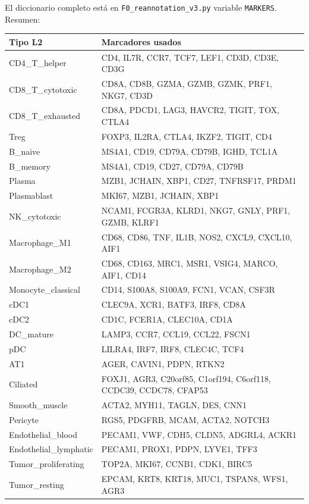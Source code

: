 \documentclass[11pt,a4paper]{article}
\begin{document}
El diccionario completo está en \texttt{F0\_reannotation\_v3.py} variable \texttt{MARKERS}. Resumen:

\begin{longtable}{|>{\ttfamily}l|p{8cm}|}
\hline
\rowcolor{lightgray}\textbf{Tipo L2} & \textbf{Marcadores usados} \\
\hline
CD4\_T\_helper & CD4, IL7R, CCR7, TCF7, LEF1, CD3D, CD3E, CD3G \\
CD8\_T\_cytotoxic & CD8A, CD8B, GZMA, GZMB, GZMK, PRF1, NKG7, CD3D \\
CD8\_T\_exhausted & CD8A, PDCD1, LAG3, HAVCR2, TIGIT, TOX, CTLA4 \\
Treg & FOXP3, IL2RA, CTLA4, IKZF2, TIGIT, CD4 \\
B\_naive & MS4A1, CD19, CD79A, CD79B, IGHD, TCL1A \\
B\_memory & MS4A1, CD19, CD27, CD79A, CD79B \\
Plasma & MZB1, JCHAIN, XBP1, CD27, TNFRSF17, PRDM1 \\
Plasmablast & MKI67, MZB1, JCHAIN, XBP1 \\
NK\_cytotoxic & NCAM1, FCGR3A, KLRD1, NKG7, GNLY, PRF1, GZMB, KLRF1 \\
Macrophage\_M1 & CD68, CD86, TNF, IL1B, NOS2, CXCL9, CXCL10, AIF1 \\
Macrophage\_M2 & CD68, CD163, MRC1, MSR1, VSIG4, MARCO, AIF1, CD14 \\
Monocyte\_classical & CD14, S100A8, S100A9, FCN1, VCAN, CSF3R \\
cDC1 & CLEC9A, XCR1, BATF3, IRF8, CD8A \\
cDC2 & CD1C, FCER1A, CLEC10A, CD1A \\
DC\_mature & LAMP3, CCR7, CCL19, CCL22, FSCN1 \\
pDC & LILRA4, IRF7, IRF8, CLEC4C, TCF4 \\
AT1 & AGER, CAVIN1, PDPN, RTKN2 \\
Ciliated & FOXJ1, AGR3, C20orf85, C1orf194, C6orf118, CCDC39, CCDC78, CFAP53 \\
Smooth\_muscle & ACTA2, MYH11, TAGLN, DES, CNN1 \\
Pericyte & RGS5, PDGFRB, MCAM, ACTA2, NOTCH3 \\
Endothelial\_blood & PECAM1, VWF, CDH5, CLDN5, ADGRL4, ACKR1 \\
Endothelial\_lymphatic & PECAM1, PROX1, PDPN, LYVE1, TFF3 \\
Tumor\_proliferating & TOP2A, MKI67, CCNB1, CDK1, BIRC5 \\
Tumor\_resting & EPCAM, KRT8, KRT18, MUC1, TSPAN8, WFS1, AGR3 \\
\hline
\end{longtable}
\end{document}
